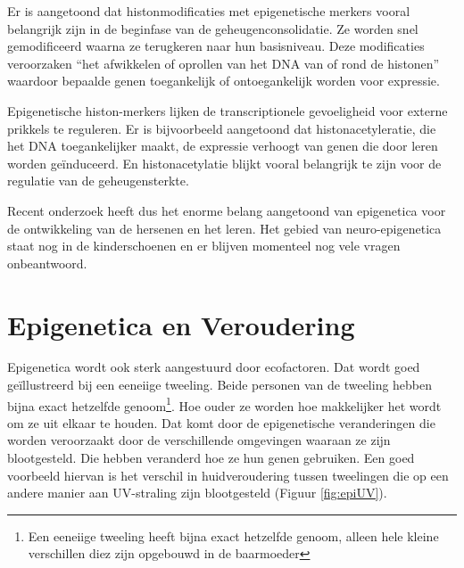 \documentclass[
  11pt,
]{book}
\begin{document}
Er is aangetoond dat histonmodificaties met epigenetische merkers vooral belangrijk zijn in de beginfase van de geheugenconsolidatie. Ze worden snel gemodificeerd waarna ze terugkeren naar hun basisniveau. Deze modificaties veroorzaken ``het afwikkelen of oprollen van het DNA van of rond de histonen'' waardoor bepaalde genen toegankelijk of ontoegankelijk worden voor expressie.

Epigenetische histon-merkers lijken de transcriptionele gevoeligheid voor externe prikkels te reguleren. Er is bijvoorbeeld aangetoond dat histonacetyleratie, die het DNA toegankelijker maakt, de expressie verhoogt van genen die door leren worden geïnduceerd. En histonacetylatie blijkt vooral belangrijk te zijn voor de regulatie van de geheugensterkte.

Recent onderzoek heeft dus het enorme belang aangetoond van epigenetica voor de ontwikkeling van de hersenen en het leren.
Het gebied van neuro-epigenetica staat nog in de kinderschoenen en er blijven momenteel nog vele vragen onbeantwoord.

\hypertarget{epigeneticaVeroudering}{%
\section{Epigenetica en Veroudering}\label{epigeneticaVeroudering}}

Epigenetica wordt ook sterk aangestuurd door ecofactoren. Dat wordt goed geïllustreerd bij een eeneiige tweeling. Beide personen van de tweeling hebben bijna exact hetzelfde genoom\footnote{Een eeneiige tweeling heeft bijna exact hetzelfde genoom, alleen hele kleine verschillen diez zijn opgebouwd in de baarmoeder}. Hoe ouder ze worden hoe makkelijker het wordt om ze uit elkaar te houden. Dat komt door de epigenetische veranderingen die worden veroorzaakt door de verschillende omgevingen waaraan ze zijn blootgesteld. Die hebben veranderd hoe ze hun genen gebruiken. Een goed voorbeeld hiervan is het verschil in huidveroudering tussen tweelingen die op een andere manier aan UV-straling zijn blootgesteld (Figuur \ref{fig:epiUV}).
\end{document}
